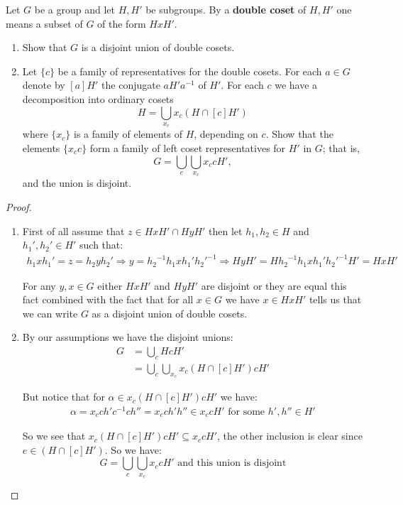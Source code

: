 \begin{exercise}
Let $G$ be a group and let $H,H'$ be subgroups. By a \textbf{double coset} of $H,H'$ one means a subset of $G$ of the form $HxH'$.\begin{enumerate}[label = (\alph*)]
\item Show that $G$ is a disjoint union of double cosets.
\item Let $\{c\}$ be a family of representatives for the double cosets. For each $a\in G$ denote by $[a]H'$ the conjugate $aH'a^{-1}$ of $H'$. For each $c$ we have a decomposition into ordinary cosets\[H = \bigcup_{x_c} x_c(H\cap [c]H')\] where $\{x_c\}$ is a family of elements of $H$, depending on $c$. Show that the elements $\{{x_c}c\}$ form a family of left coset representatives for $H'$ in $G$; that is,\[G = \bigcup_{c}\bigcup_{x_c}{x_c}cH',\] and the union is disjoint.
\end{enumerate}
\begin{proof}
\begin{enumerate}[label = (\alph*)]
\item First of all assume that $z\in HxH'\cap HyH'$ then let $h_1,h_2\in H$ and $h_1', h_2'\in H'$ such that:\begin{align*}
h_1xh_1' = z = h_2yh_2'\Rightarrow y = {h_2}^{-1}h_1xh_1'{h_2'}^{-1} \Rightarrow HyH' = H{h_2}^{-1}h_1xh_1'{h_2'}^{-1}H' = HxH'
\end{align*} 

For any $y,x\in G$ either $HxH'$ and $HyH'$ are disjoint or they are equal this fact combined with the fact that for all $x\in G$ we have $x\in HxH'$ tells us that we can write $G$ as a disjoint union of double cosets.

\item  By our assumptions we have the disjoint unions:\begin{align*}
G &= \bigcup_c HcH'\\
&= \bigcup_c\bigcup_{x_c}x_c(H\cap [c]H')cH'
\end{align*}

But notice that for $\alpha\in x_c(H\cap [c]H')cH'$ we have:\begin{align*}
\alpha = {x_c}ch'c^{-1}ch'' = {x_c}ch'h''\in {x_c}cH' \text{ for some }h',h''\in H'  
\end{align*}

So we see that $x_c(H\cap [c]H')cH'\subseteq {x_c}cH'$, the other inclusion is clear since $e\in (H\cap [c]H')$. So we have:\begin{equation*}
G = \bigcup_c\bigcup_{x_c}{x_c}cH' \text{ and this union is disjoint} 
\end{equation*}
\end{enumerate}
\end{proof}
\end{exercise}

